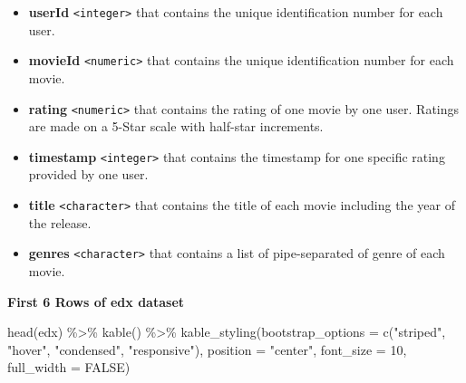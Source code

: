 \documentclass[
]{article}
\newenvironment{Shaded}{}{}
\newcommand{\AttributeTok}[1]{\textcolor[rgb]{0.49,0.56,0.16}{#1}}
\newcommand{\ConstantTok}[1]{\textcolor[rgb]{0.53,0.00,0.00}{#1}}
\newcommand{\DecValTok}[1]{\textcolor[rgb]{0.25,0.63,0.44}{#1}}
\newcommand{\FunctionTok}[1]{\textcolor[rgb]{0.02,0.16,0.49}{#1}}
\newcommand{\NormalTok}[1]{#1}
\newcommand{\SpecialCharTok}[1]{\textcolor[rgb]{0.25,0.44,0.63}{#1}}
\newcommand{\StringTok}[1]{\textcolor[rgb]{0.25,0.44,0.63}{#1}}
\providecommand{\tightlist}{%
  \setlength{\itemsep}{0pt}\setlength{\parskip}{0pt}}
\begin{document}
\begin{itemize}
\tightlist
\item
  \textbf{userId} \texttt{\textless{}integer\textgreater{}} that
  contains the unique identification number for each user.
\item
  \textbf{movieId} \texttt{\textless{}numeric\textgreater{}} that
  contains the unique identification number for each movie.
\item
  \textbf{rating} \texttt{\textless{}numeric\textgreater{}} that
  contains the rating of one movie by one user. Ratings are made on a
  5-Star scale with half-star increments.
\item
  \textbf{timestamp} \texttt{\textless{}integer\textgreater{}} that
  contains the timestamp for one specific rating provided by one user.
\item
  \textbf{title} \texttt{\textless{}character\textgreater{}} that
  contains the title of each movie including the year of the release.
\item
  \textbf{genres} \texttt{\textless{}character\textgreater{}} that
  contains a list of pipe-separated of genre of each movie.
\end{itemize}

\newpage

\textbf{First 6 Rows of edx dataset}

\begin{Shaded}
\begin{Highlighting}[]
\FunctionTok{head}\NormalTok{(edx) }\SpecialCharTok{\%\textgreater{}\%}
   \FunctionTok{kable}\NormalTok{() }\SpecialCharTok{\%\textgreater{}\%}
   \FunctionTok{kable\_styling}\NormalTok{(}\AttributeTok{bootstrap\_options =} \FunctionTok{c}\NormalTok{(}\StringTok{"striped"}\NormalTok{, }\StringTok{"hover"}\NormalTok{, }\StringTok{"condensed"}\NormalTok{, }\StringTok{"responsive"}\NormalTok{),}
                 \AttributeTok{position =} \StringTok{"center"}\NormalTok{,}
                 \AttributeTok{font\_size =} \DecValTok{10}\NormalTok{,}
                 \AttributeTok{full\_width =} \ConstantTok{FALSE}\NormalTok{)}
\end{Highlighting}
\end{Shaded}
\end{document}
